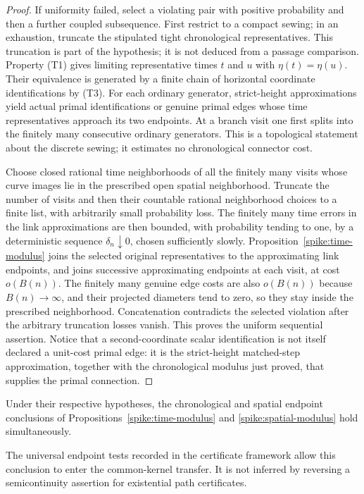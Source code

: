 \begin{proof}
If uniformity failed, select a violating pair with positive probability
and then a further coupled subsequence.  First restrict to a compact
sewing; in an exhaustion, truncate the stipulated tight chronological
representatives.  This truncation is part of the hypothesis; it is not
deduced from a passage comparison.  Property (T1) gives limiting representative times
$t$ and $u$ with $\eta(t)=\eta(u)$.  Their equivalence is generated by a
finite chain of horizontal coordinate identifications by (T3).  For each
ordinary generator, strict-height approximations yield actual primal
identifications or genuine primal edges whose time representatives
approach its two endpoints.  At a branch visit one first splits into
the finitely many consecutive ordinary generators.  This is a
topological statement about the discrete sewing; it estimates no
chronological connector cost.

Choose closed rational time neighborhoods of all the finitely many
visits whose curve images lie in the prescribed open spatial
neighborhood.  Truncate the number of visits and then their countable
rational neighborhood choices to a finite list, with arbitrarily small
probability loss.  The finitely many time errors in the link approximations
are then bounded, with probability tending to one, by a deterministic
sequence $\delta_n\downarrow0$, chosen sufficiently slowly.
Proposition~\ref{spike:time-modulus} joins the selected original
representatives to the approximating link endpoints, and joins
successive approximating endpoints at each visit, at cost $o(B(n))$.
The finitely many genuine edge costs are also $o(B(n))$ because
$B(n)\to\infty$, and their projected diameters tend to zero, so they
stay inside the prescribed neighborhood.  Concatenation contradicts
the selected violation after the arbitrary truncation losses vanish.
This proves the uniform sequential assertion.  Notice that a
second-coordinate scalar identification is not itself declared a
unit-cost primal edge: it is the strict-height matched-step
approximation, together with the chronological modulus just proved,
that supplies the primal connection.
\end{proof}

\begin{corollary}
\label{spike:endpoint-modulus}
Under their respective hypotheses, the chronological and spatial
endpoint conclusions of Propositions~\ref{spike:time-modulus} and
\ref{spike:spatial-modulus} hold simultaneously.
\end{corollary}

The universal endpoint tests recorded in the certificate framework
allow this conclusion to enter the common-kernel transfer.  It is not
inferred by reversing a semicontinuity assertion for existential path
certificates.
